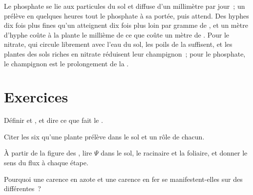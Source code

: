 \begin{example}\label{ex:b1:plant-water-minerals:phosphate}
Le phosphate se lie aux particules du sol et diffuse d'un millimètre
par jour~; un  prélève en quelques heures tout le
phosphate à sa portée, puis attend. Des hyphes dix fois plus fines
qu'un  atteignent dix fois plus loin par gramme de ,
et un mètre d'hyphe coûte à la plante le millième de ce que coûte un
mètre de . Pour le nitrate, qui circule librement avec l'eau du
sol, les poils de la  suffisent, et les plantes des sols riches
en nitrate réduisent leur champignon~; pour le phosphate, le champignon
est le prolongement de la .
\end{example}

\section{Exercices}

\begin{exercise}[$\star$]\label{exo:b1:plant-water-minerals:1}
Définir  et , et dire ce que fait le .
\end{exercise}

\begin{exercise}[$\star$]\label{exo:b1:plant-water-minerals:2}
Citer les six  qu'une plante prélève dans le sol et un
rôle de chacun.
\end{exercise}

\begin{exercise}[$\star$]\label{exo:b1:plant-water-minerals:3}
À partir de la figure des , lire $\Psi$ dans le
sol, le  racinaire et la  foliaire, et donner le sens du
flux à chaque étape.
\end{exercise}

\begin{exercise}[$\star$]\label{exo:b1:plant-water-minerals:4}
Pourquoi une carence en azote et une carence en fer se manifestent-elles
sur des  différentes~?
\end{exercise}


